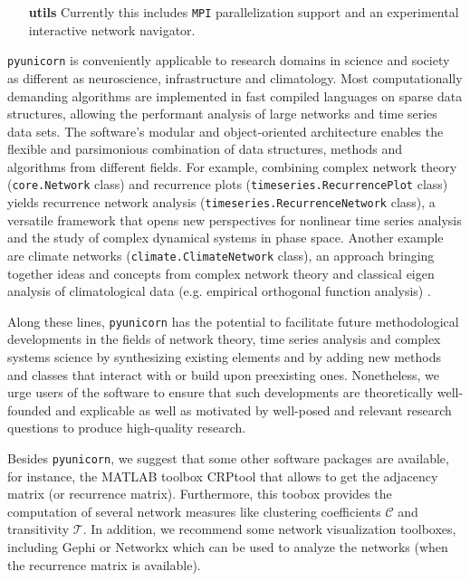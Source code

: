 \begin{enumerate}
\item[\bf{utils}] Currently this includes \texttt{MPI} parallelization support and an experimental interactive network navigator.
\end{enumerate}

\texttt{pyunicorn} is conveniently applicable to research domains in science and society as different as neuroscience, infrastructure and climatology. Most computationally demanding algorithms are implemented in fast compiled languages on sparse data structures, allowing the performant analysis of large networks and time series data sets. The software's modular and object-oriented architecture enables the flexible and parsimonious combination of data structures, methods and algorithms from different fields. For example, combining complex network theory (\texttt{core.Network} class) and recurrence plots (\texttt{timeseries.RecurrencePlot} class) yields recurrence network analysis (\texttt{timeseries.RecurrenceNetwork} class), a versatile framework that opens new perspectives for nonlinear time series analysis and the study of complex dynamical systems in phase space. Another example are climate networks (\texttt{climate.ClimateNetwork} class), an approach bringing together ideas and concepts from complex network theory and classical eigen analysis of climatological data (e.g. empirical orthogonal function analysis) \cite{Donges2015}.

Along these lines, \texttt{pyunicorn} has the potential to facilitate future methodological developments in the fields of network theory, time series analysis and complex systems science by synthesizing existing elements and by adding new methods and classes that interact with or build upon preexisting ones. Nonetheless, we urge users of the software to ensure that such developments are theoretically well-founded and explicable as well as motivated by well-posed and relevant research questions to produce high-quality research.

Besides \texttt{pyunicorn}, we suggest that some other software packages are available, for instance, the MATLAB toolbox CRPtool that allows to get the adjacency matrix (or recurrence matrix). Furthermore, this toobox provides the computation of several network measures like clustering coefficients $\mathcal{C}$ and transitivity $\mathcal{T}$. In addition, we recommend some network visualization toolboxes, including Gephi or Networkx which can be used to analyze the networks (when the recurrence matrix is available).
